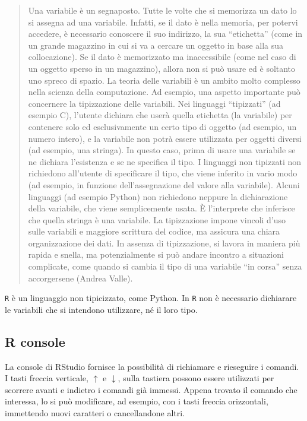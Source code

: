 \documentclass[
]{memoir}
\theoremstyle{definition}
\theoremstyle{definition}
\theoremstyle{definition}
\theoremstyle{definition}
\theoremstyle{remark}
\begin{document}
\begin{quote}
Una variabile è un segnaposto. Tutte le volte che si memorizza un dato lo si assegna ad una variabile. Infatti, se il dato è nella memoria, per potervi accedere, è necessario conoscere il suo indirizzo, la sua ``etichetta'' (come in un grande magazzino in cui si va a cercare un oggetto in base alla sua collocazione). Se il dato è memorizzato ma inaccessibile (come nel caso di un oggetto sperso in un magazzino), allora non si può usare ed è soltanto uno spreco di spazio. La teoria delle variabili è un ambito molto complesso nella scienza della computazione. Ad esempio, una aspetto importante può concernere la tipizzazione delle variabili. Nei linguaggi ``tipizzati'' (ad esempio C), l'utente dichiara che userà quella etichetta (la variabile) per contenere solo ed esclusivamente un certo tipo di oggetto (ad esempio, un numero intero), e la variabile non potrà essere utilizzata per oggetti diversi (ad esempio, una stringa). In questo caso, prima di usare una variabile se ne dichiara l'esistenza e se ne specifica il tipo. I linguaggi non tipizzati non richiedono all'utente di specificare il tipo, che viene inferito in vario modo (ad esempio, in funzione dell'assegnazione del valore alla variabile). Alcuni linguaggi (ad esempio Python) non richiedono neppure la dichiarazione della variabile, che viene semplicemente usata. È l'interprete che inferisce che quella stringa è una variabile. La tipizzazione impone vincoli d'uso sulle variabili e maggiore scrittura del codice, ma assicura una chiara organizzazione dei dati. In assenza di tipizzazione, si lavora in maniera più rapida e snella, ma potenzialmente si può andare incontro a situazioni complicate, come quando si cambia il tipo di una variabile ``in corsa'' senza accorgersene (Andrea Valle).
\end{quote}

\texttt{R} è un linguaggio non tipicizzato, come Python. In \texttt{R} non è necessario dichiarare le variabili che si intendono utilizzare, né il loro tipo.

\hypertarget{r-console}{%
\subsection{R console}\label{r-console}}

La console di RStudio fornisce la possibilità di richiamare e rieseguire
i comandi. I tasti freccia verticale, \(\uparrow\) e \(\downarrow\), sulla
tastiera possono essere utilizzati per scorrere avanti e indietro i
comandi già immessi. Appena trovato il comando che interessa, lo si può
modificare, ad esempio, con i tasti freccia orizzontali, immettendo
nuovi caratteri o cancellandone altri.
\end{document}
